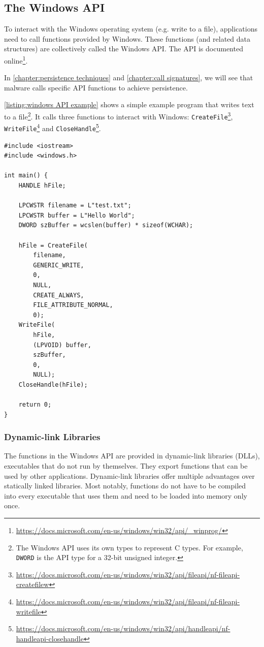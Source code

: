 \subsection{The Windows API}\label{section:background windows api}
To interact with the Windows operating system (e.g. write to a file), applications need to call functions provided by Windows. These functions (and related data structures) are collectively called the Windows API. The API is documented online\footnote{\tiny \url{https://docs.microsoft.com/en-us/windows/win32/api/_winprog/}}.

In \autoref{chapter:persistence techniques} and \autoref{chapter:call signatures}, we will see that malware calls specific API functions to achieve persistence.

\autoref{listing:windows API example} shows a simple example program that writes text to a file\footnote{The Windows API uses its own types to represent C types. For example, \texttt{DWORD} is the API type for a 32-bit unsigned integer.}. It calls three functions to interact with Windows: \texttt{CreateFile}\footnote{\tiny \url{https://docs.microsoft.com/en-us/windows/win32/api/fileapi/nf-fileapi-createfilew}}, \texttt{WriteFile}\footnote{\tiny \url{https://docs.microsoft.com/en-us/windows/win32/api/fileapi/nf-fileapi-writefile}} and \texttt{CloseHandle}\footnote{\tiny \url{https://docs.microsoft.com/en-us/windows/win32/api/handleapi/nf-handleapi-closehandle}}.

\begin{minipage}{0.9\textwidth}
\begin{lstlisting}[caption={An example of creating and writing to a file using the Windows API.}, captionpos=b, label={listing:windows API example}]
#include <iostream>
#include <windows.h>

int main() {
	HANDLE hFile;

	LPCWSTR filename = L"test.txt";
	LPCWSTR buffer = L"Hello World";
	DWORD szBuffer = wcslen(buffer) * sizeof(WCHAR);

	hFile = CreateFile(
		filename,
		GENERIC_WRITE,
		0,
		NULL,
		CREATE_ALWAYS,
		FILE_ATTRIBUTE_NORMAL,
		0);
	WriteFile(
		hFile,
		(LPVOID) buffer,
		szBuffer,
		0,
		NULL);
	CloseHandle(hFile);

	return 0;
}
\end{lstlisting}
\end{minipage}

\subsubsection{Dynamic-link Libraries}\label{section:dlls}
The functions in the Windows API are provided in dynamic-link libraries (DLLs), executables that do not run by themselves. They export functions that can be used by other applications. Dynamic-link libraries offer multiple advantages over statically linked libraries. Most notably, functions do not have to be compiled into every executable that uses them and need to be loaded into memory only once.

